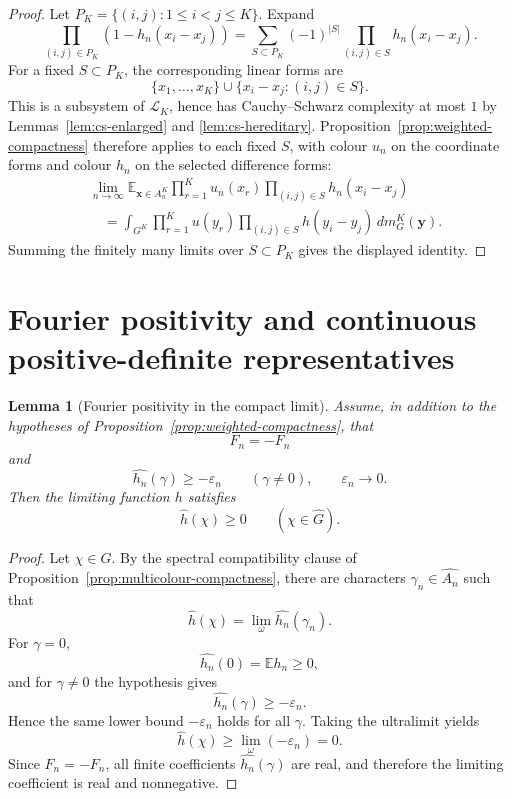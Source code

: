 \documentclass[11pt]{article}
\numberwithin{equation}{section}
\newtheorem{lemma}[theorem]{Lemma}
\newcommand{\E}{\mathbb E}
\newcommand{\1}{\mathbf 1}
\begin{document}
\begin{proof}
Let \(P_K=\{(i,j):1\le i<j\le K\}\).  Expand
\[
        \prod_{(i,j)\in P_K}(1-h_n(x_i-x_j))
        =
        \sum_{S\subset P_K}(-1)^{|S|}
        \prod_{(i,j)\in S}h_n(x_i-x_j).
\]
For a fixed \(S\subset P_K\), the corresponding linear forms are
\[
        \{x_1,\ldots,x_K\}
        \cup
        \{x_i-x_j:(i,j)\in S\}.
\]
This is a subsystem of \(\mathcal L_K\), hence has Cauchy--Schwarz
complexity at most \(1\) by Lemmas~\ref{lem:cs-enlarged} and
\ref{lem:cs-hereditary}.  Proposition~\ref{prop:weighted-compactness}
therefore applies to each fixed \(S\), with colour \(u_n\) on the
coordinate forms and colour \(h_n\) on the selected difference forms:
\[
\begin{aligned}
&\lim_{n\to\infty}
\E_{\mathbf x\in A_n^K}
        \prod_{r=1}^K u_n(x_r)
        \prod_{(i,j)\in S}h_n(x_i-x_j) \\
&\quad =
\int_{G^K}
        \prod_{r=1}^K u(y_r)
        \prod_{(i,j)\in S}h(y_i-y_j)
        \,dm_G^K(\mathbf y).
\end{aligned}
\]
Summing the finitely many limits over \(S\subset P_K\) gives the displayed
identity.
\end{proof}

\section{Fourier positivity and continuous positive-definite representatives}
\label{sec:fourier-positive}

\begin{lemma}[Fourier positivity in the compact limit]
\label{lem:limit-fourier-positive}
Assume, in addition to the hypotheses of
Proposition~\ref{prop:weighted-compactness}, that
\[
        F_n=-F_n
\]
and
\[
        \widehat{h_n}(\gamma)\ge-\varepsilon_n
        \qquad(\gamma\ne0),
        \qquad
        \varepsilon_n\to0.
\]
Then the limiting function \(h\) satisfies
\[
        \widehat h(\chi)\ge0
        \qquad(\chi\in\widehat G).
\]
\end{lemma}

\begin{proof}
Let \(\chi\in\widehat G\).  By the spectral compatibility clause of
Proposition~\ref{prop:multicolour-compactness}, there are characters
\(\gamma_n\in\widehat{A_n}\) such that
\[
        \widehat h(\chi)=\lim_\omega \widehat{h_n}(\gamma_n).
\]
For \(\gamma=0\),
\[
        \widehat{h_n}(0)=\E h_n\ge0,
\]
and for \(\gamma\ne0\) the hypothesis gives
\[
        \widehat{h_n}(\gamma)\ge-\varepsilon_n.
\]
Hence the same lower bound \(-\varepsilon_n\) holds for all \(\gamma\).
Taking the ultralimit yields
\[
        \widehat h(\chi)
        \ge
        \lim_\omega(-\varepsilon_n)=0.
\]
Since \(F_n=-F_n\), all finite coefficients \(\widehat{h_n}(\gamma)\) are
real, and therefore the limiting coefficient is real and nonnegative.
\end{proof}
\end{document}

